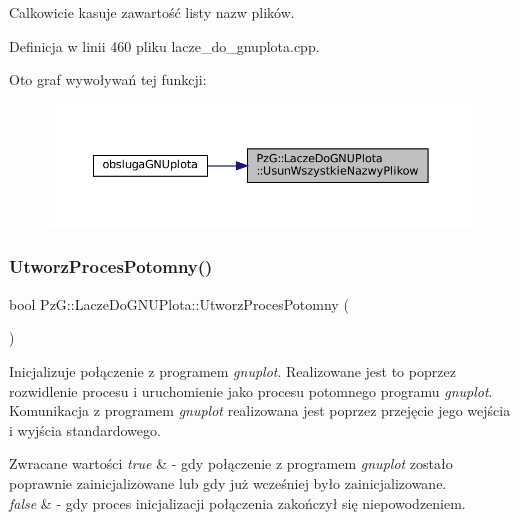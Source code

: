 Calkowicie kasuje zawartość listy nazw plików. 

Definicja w linii 460 pliku lacze\+\_\+do\+\_\+gnuplota.\+cpp.

Oto graf wywoływań tej funkcji\+:\nopagebreak
\begin{figure}[H]
\begin{center}
\leavevmode
\includegraphics[width=350pt]{class_pz_g_1_1_lacze_do_g_n_u_plota_a89a1d90d017d264cd26398464d074073_icgraph}
\end{center}
\end{figure}
\mbox{\label{class_pz_g_1_1_lacze_do_g_n_u_plota_a1c7b9acc40de8d8bbb40fb0722512933}} 
\subsubsection{\texorpdfstring{UtworzProcesPotomny()}{UtworzProcesPotomny()}}
{\footnotesize\ttfamily bool Pz\+G\+::\+Lacze\+Do\+G\+N\+U\+Plota\+::\+Utworz\+Proces\+Potomny (\begin{DoxyParamCaption}{ }\end{DoxyParamCaption})\hspace{0.3cm}{\ttfamily [protected]}}

Inicjalizuje połączenie z programem {\itshape gnuplot}. Realizowane jest to poprzez rozwidlenie procesu i uruchomienie jako procesu potomnego programu {\itshape gnuplot}. Komunikacja z programem {\itshape gnuplot} realizowana jest poprzez przejęcie jego wejścia i wyjścia standardowego.


\begin{DoxyRetVals}{Zwracane wartości}
{\em true} & -\/ gdy połączenie z programem {\itshape gnuplot} zostało poprawnie zainicjalizowane lub gdy już wcześniej było zainicjalizowane. \\
\hline
{\em false} & -\/ gdy proces inicjalizacji połączenia zakończył się niepowodzeniem. \\
\hline
\end{DoxyRetVals}


